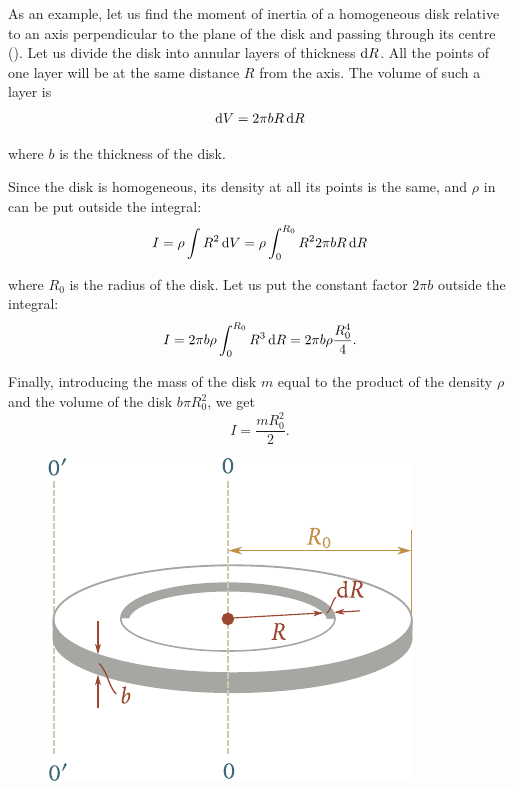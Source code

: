 As an example, let us find the moment of inertia of a homogeneous disk relative to an axis perpendicular to the plane of the disk and passing through its centre (). Let us divide the disk into annular layers of thickness $\mathrm{d} R$. All the points of one layer will be at the same distance $R$ from the axis. The volume of such a layer is
\begin{equation*}
\mathrm{d} V = 2\pi bR\,\mathrm{d} R
\end{equation*}

\noindent
where $b$ is the thickness of the disk.

Since the disk is homogeneous, its density at all its points is the same, and $\rho$ in  can be put outside the integral:
\begin{equation*}
I = \rho \int R^2\,\mathrm{d} V = \rho \int_0^{R_0} R^2 2\pi bR\,\mathrm{d} R
\end{equation*}

\noindent
where $R_0$ is the radius of the disk. Let us put the constant factor $2\pi b$ outside the integral:
\begin{equation*}
I = 2\pi b\rho \int_0^{R_0} R^3\,\mathrm{d} R = 2\pi b\rho\frac{R^4_0}{4}.
\end{equation*}

\noindent
Finally, introducing the mass of the disk $m$ equal to the product of the density $\rho$ and the volume of the disk $b\pi R^2_0$, we get
\begin{equation}\label{eq:5_22}
I = \frac{mR_0^2}{2}.
\end{equation}

\begin{figure}[t]
	\begin{center}
		\includegraphics[scale=0.95]{figures/ch_05/fig_5_11.pdf}
		\caption[]{}
		\label{fig:5_11}
	\end{center}
\vspace{-1.0cm}
\end{figure}

